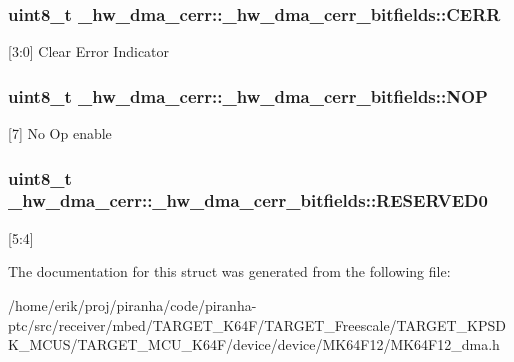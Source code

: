 \subsubsection[{\texorpdfstring{C\+E\+RR}{CERR}}]{\setlength{\rightskip}{0pt plus 5cm}uint8\+\_\+t \+\_\+hw\+\_\+dma\+\_\+cerr\+::\+\_\+hw\+\_\+dma\+\_\+cerr\+\_\+bitfields\+::\+C\+E\+RR}\hypertarget{struct__hw__dma__cerr_1_1__hw__dma__cerr__bitfields_a68822305bb5a3108e9c42b22ad842c56}{}\label{struct__hw__dma__cerr_1_1__hw__dma__cerr__bitfields_a68822305bb5a3108e9c42b22ad842c56}
\mbox{[}3\+:0\mbox{]} Clear Error Indicator 
\subsubsection[{\texorpdfstring{N\+OP}{NOP}}]{\setlength{\rightskip}{0pt plus 5cm}uint8\+\_\+t \+\_\+hw\+\_\+dma\+\_\+cerr\+::\+\_\+hw\+\_\+dma\+\_\+cerr\+\_\+bitfields\+::\+N\+OP}\hypertarget{struct__hw__dma__cerr_1_1__hw__dma__cerr__bitfields_a91c0d1fa1d5a364fc439d1d6de68ae03}{}\label{struct__hw__dma__cerr_1_1__hw__dma__cerr__bitfields_a91c0d1fa1d5a364fc439d1d6de68ae03}
\mbox{[}7\mbox{]} No Op enable 
\subsubsection[{\texorpdfstring{R\+E\+S\+E\+R\+V\+E\+D0}{RESERVED0}}]{\setlength{\rightskip}{0pt plus 5cm}uint8\+\_\+t \+\_\+hw\+\_\+dma\+\_\+cerr\+::\+\_\+hw\+\_\+dma\+\_\+cerr\+\_\+bitfields\+::\+R\+E\+S\+E\+R\+V\+E\+D0}\hypertarget{struct__hw__dma__cerr_1_1__hw__dma__cerr__bitfields_a33f702a96a1b5431dafc4b8fa1eae5f3}{}\label{struct__hw__dma__cerr_1_1__hw__dma__cerr__bitfields_a33f702a96a1b5431dafc4b8fa1eae5f3}
\mbox{[}5\+:4\mbox{]} 

The documentation for this struct was generated from the following file\+:\begin{DoxyCompactItemize}
\item 
/home/erik/proj/piranha/code/piranha-\/ptc/src/receiver/mbed/\+T\+A\+R\+G\+E\+T\+\_\+\+K64\+F/\+T\+A\+R\+G\+E\+T\+\_\+\+Freescale/\+T\+A\+R\+G\+E\+T\+\_\+\+K\+P\+S\+D\+K\+\_\+\+M\+C\+U\+S/\+T\+A\+R\+G\+E\+T\+\_\+\+M\+C\+U\+\_\+\+K64\+F/device/device/\+M\+K64\+F12/M\+K64\+F12\+\_\+dma.\+h\end{DoxyCompactItemize}
